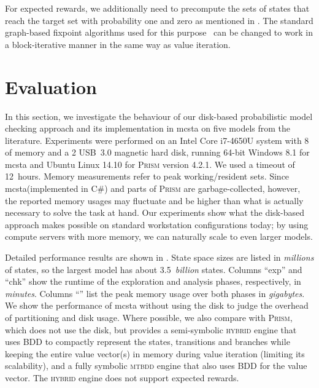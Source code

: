 \documentclass{llncs}
\newcommand{\mcsta}{\textsf{\mbox{mcsta}}\xspace}
\newcommand{\sunit}[1]{\text{\begin{scriptsize}\,#1\end{scriptsize}}}
\newcommand{\ssunit}[1]{\text{\begin{scriptsize}#1\end{scriptsize}}}
\newcommand{\prism}{\textsc{Prism}\xspace}
\begin{document}
For expected rewards, we additionally need to precompute the sets of states that reach the target set with probability one and zero as mentioned in .
The standard graph-based fixpoint algorithms used for this purpose~\cite{FKNP11} can be changed to work in a block-iterative manner in the same way as value iteration.




\section{Evaluation}
\label{sec:Evaluation}

In this section, we investigate the behaviour of our disk-based probabilistic model checking approach and its implementation in \mcsta on five models from the literature. Experiments were performed on an Intel Core i7-4650U system with 8\sunit{GB} of memory and a 2\sunit{TB} USB~3.0 magnetic hard disk, running
64-bit Windows 8.1 for \mcsta and Ubuntu Linux 14.10 for \prism version 4.2.1.
We used a timeout of 12~hours.
Memory measurements refer to peak working/resident sets.
Since \mcsta (implemented in C\#) and parts of \prism are garbage-collected, however, the reported memory usages may fluctuate and be higher than what is actually necessary to solve the task at hand.
Our experiments show what the disk-based approach makes possible on standard workstation configurations today; by using compute servers with more memory, we can naturally scale to even larger models.

Detailed performance results are shown in .
State space sizes are listed in \emph{millions} of states, so the largest model has about 3.5~\emph{billion} states.
Columns ``exp'' and ``chk'' show the runtime of the exploration and analysis phases, respectively, in \emph{minutes}.
Columns ``\ssunit{\!GB}'' list the peak memory usage over both phases in \emph{gigabytes}.
We show the performance of \mcsta without using the disk to judge the overhead of partitioning and disk usage. 
Where possible, we also compare with \prism, which does not use the disk, but provides a semi-symbolic \textsc{hybrid} engine that uses BDD to compactly represent the states, transitions and branches while keeping the entire value vector(s) in memory during value iteration (limiting its scalability), and a fully symbolic \textsc{mtbdd} engine that also uses BDD for the value vector.
The \textsc{hybrid} engine does not support expected rewards.
\end{document}
